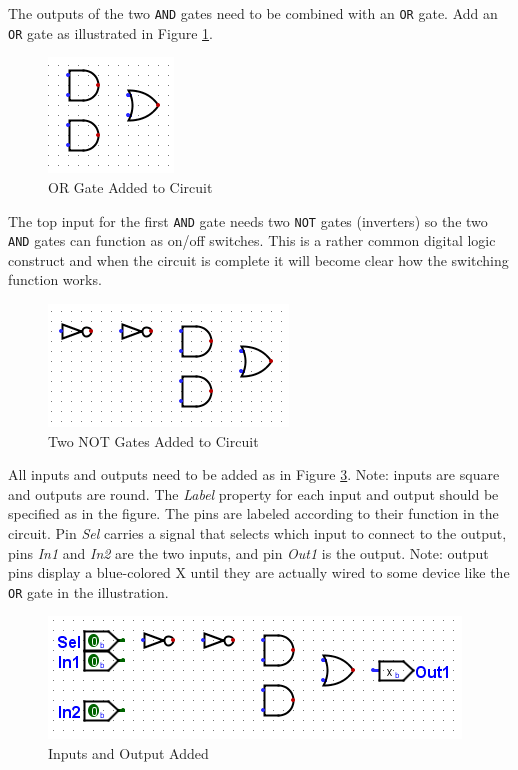 The outputs of the two \texttt{AND} gates need to be combined with an \texttt{OR} gate. Add an \texttt{OR} gate as illustrated in Figure \ref{fig:intro-04}.

\begin{figure}[H]
	\centering
	\includegraphics[width=\maxwidth{.95\linewidth}]{gfx/intro-04}
	\caption{OR Gate Added to Circuit}
	\label{fig:intro-04}
\end{figure}

The top input for the first \texttt{AND} gate needs two \texttt{NOT} gates (inverters) so the two \texttt{AND} gates can function as on/off switches. This is a rather common digital logic construct and when the circuit is complete it will become clear how the switching function works.

\begin{figure}[H]
	\centering
	\includegraphics[width=\maxwidth{.95\linewidth}]{gfx/intro-05}
	\caption{Two NOT Gates Added to Circuit}
	\label{fig:intro-05}
\end{figure}

All inputs and outputs need to be added as in Figure \ref{fig:intro-06}. Note: inputs are square and outputs are round. The \textit{Label} property for each input and output should be specified as in the figure. The pins are labeled according to their function in the circuit. Pin \textit{Sel} carries a signal that selects which input to connect to the output, pins \textit{In1} and \textit{In2} are the two inputs, and pin \textit{Out1} is the output. Note: output pins display a blue-colored \textsf{X} until they are actually wired to some device like the \texttt{OR} gate in the illustration.
 
\begin{figure}[H]
	\centering
	\includegraphics[width=\maxwidth{.95\linewidth}]{gfx/intro-06}
	\caption{Inputs and Output Added}
	\label{fig:intro-06}
\end{figure}

